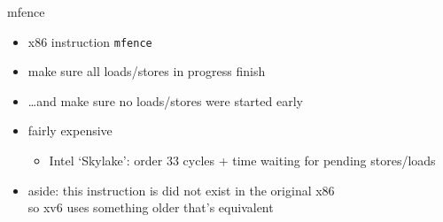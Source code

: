 
\begin{frame}{mfence}
    \begin{itemize}
        \item x86 instruction \texttt{mfence}
        \item make sure all loads/stores in progress finish
        \item \ldots and make sure no loads/stores were started early
            \vspace{.5cm}
        \item fairly expensive 
            \begin{itemize}
            \item Intel `Skylake': order 33 cycles + time waiting for pending stores/loads
            \end{itemize}
        \vspace{.5cm}
        \item<2-> aside: this instruction is did not exist in the original x86 \\
                so xv6 uses something older that's equivalent
    \end{itemize}
\end{frame}


